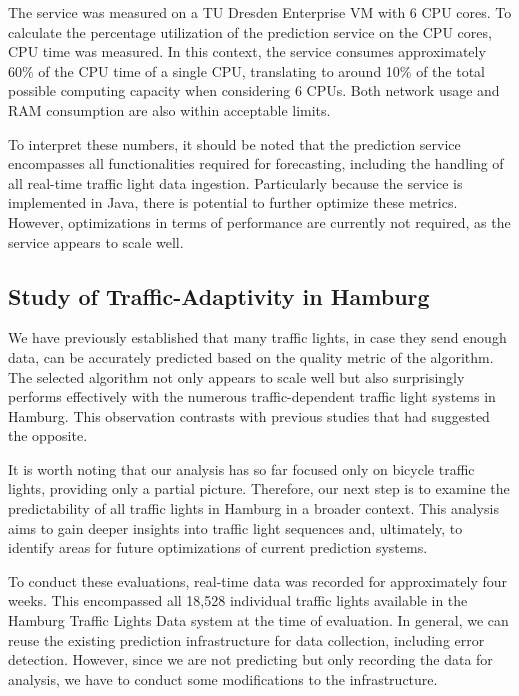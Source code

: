 The service was measured on a TU Dresden Enterprise VM with 6 CPU cores. To calculate the percentage utilization of the prediction service on the CPU cores, CPU time was measured. In this context, the service consumes approximately 60\% of the CPU time of a single CPU, translating to around 10\% of the total possible computing capacity when considering 6 CPUs. Both network usage and RAM consumption are also within acceptable limits.

To interpret these numbers, it should be noted that the prediction service encompasses all functionalities required for forecasting, including the handling of all real-time traffic light data ingestion. Particularly because the service is implemented in Java, there is potential to further optimize these metrics. However, optimizations in terms of performance are currently not required, as the service appears to scale well.

\subsection{Study of Traffic-Adaptivity in Hamburg}

We have previously established that many traffic lights, in case they send enough data, can be accurately predicted based on the quality metric of the algorithm. The selected algorithm not only appears to scale well but also surprisingly performs effectively with the numerous traffic-dependent traffic light systems in Hamburg. This observation contrasts with previous studies that had suggested the opposite.

It is worth noting that our analysis has so far focused only on bicycle traffic lights, providing only a partial picture. Therefore, our next step is to examine the predictability of all traffic lights in Hamburg in a broader context. This analysis aims to gain deeper insights into traffic light sequences and, ultimately, to identify areas for future optimizations of current prediction systems.

To conduct these evaluations, real-time data was recorded for approximately four weeks. This encompassed all 18,528 individual traffic lights available in the Hamburg Traffic Lights Data system at the time of evaluation. In general, we can reuse the existing prediction infrastructure for data collection, including error detection. However, since we are not predicting but only recording the data for analysis, we have to conduct some modifications to the infrastructure. 

